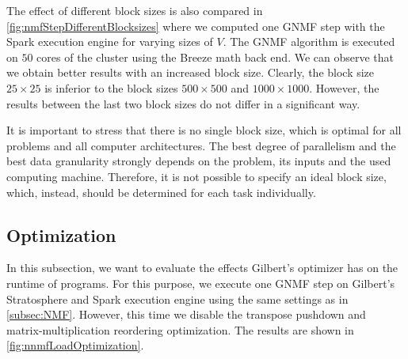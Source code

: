 The effect of different block sizes is also compared in \cref{fig:nmfStepDifferentBlocksizes} where we computed one GNMF step with the Spark execution engine for varying sizes of $V$.
The GNMF algorithm is executed on $50$ cores of the cluster using the Breeze math back end.
We can observe that we obtain better results with an increased block size.
Clearly, the block size $25 \times 25$ is inferior to the block sizes $500\times 500$ and $1000\times 1000$.
However, the results between the last two block sizes do not differ in a significant way.

It is important to stress that there is no single block size, which is optimal for all problems and all computer architectures.
The best degree of parallelism and the best data granularity strongly depends on the problem, its inputs and the used computing machine.
Therefore, it is not possible to specify an ideal block size, which, instead, should be determined for each task individually.

\subsection{Optimization}

In this subsection, we want to evaluate the effects Gilbert's optimizer has on the runtime of programs.
For this purpose, we execute one GNMF step on Gilbert's Stratosphere and Spark execution engine using the same settings as in \cref{subsec:NMF}.
However, this time we disable the transpose pushdown and matrix-multiplication reordering optimization.
The results are shown in \cref{fig:nnmfLoadOptimization}.

